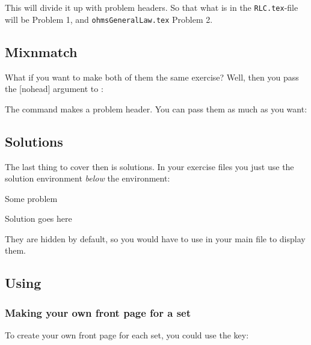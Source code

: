 \begin{dispListing}
\end{dispListing}
This will divide it up with problem headers. So that what is in the \texttt{RLC.tex}-file will be Problem 1, and \texttt{ohmsGeneralLaw.tex} Problem 2.
\subsection{Mixnmatch}
What if you want to make both of them the same exercise? Well, then you pass the [nohead] argument to :
\begin{dispListing}
\end{dispListing}
The  command makes a problem header. You can pass them as much as you want:

\begin{dispListing}
\end{dispListing}

\subsection{Solutions}
The last thing to cover then is solutions. In your exercise files you just use the solution environment \emph{below} the  environment:
\begin{dispListing}
\begin{problem}
Some problem
\end{problem}
\begin{solution}
Solution goes here
\end{solution}
\end{dispListing}
They are hidden by default, so you would have to use  in
your main file to display them.

\subsection{Using }
\subsubsection{Making your own front page for a set}

To create your own front page for each set, you could use the  key:
\begin{dispListing}
\end{dispListing}\\

